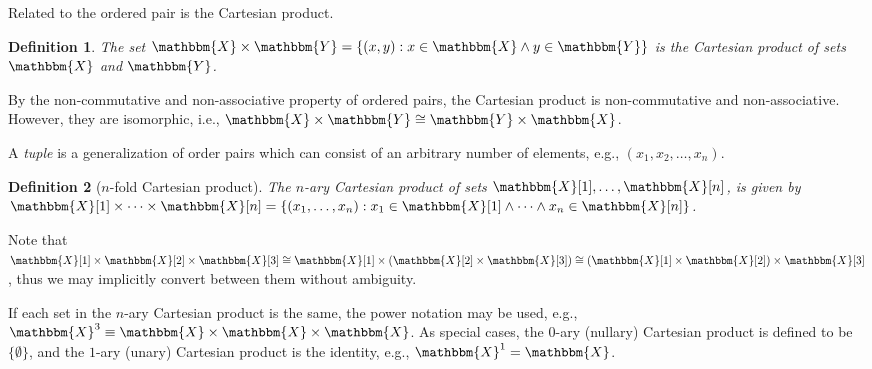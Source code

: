 \documentclass[hidelinks,11pt,final]{article}
\newcommand{\envnumstyle}{section}
\theoremstyle{plain}
\newtheorem{definition}{Definition}[\envnumstyle]
\newcounter{examplecounter}
\newenvironment{example}
{
    \refstepcounter{examplecounter}%
    \par\vspace{\baselineskip}\noindent 
    \textbf{Example \theexamplecounter}%
    \begin{itshape}
    \quad
}
{
    \end{itshape}
    \par\vspace{\baselineskip}%
    \noindent\ignorespacesafterend     
}
\begin{document}
Related to the ordered pair is the Cartesian product.
\begin{definition}
The set $\mathbbm{X} \times \mathbbm{Y} = \left\{(x,y) : x \in 
\mathbbm{X} \land y \in \mathbbm{Y}\right\}$ is the Cartesian product of sets $\mathbbm{X}$ 
and $\mathbbm{Y}$.
\end{definition}
By the non-commutative and non-associative property of ordered pairs, the Cartesian product is non-commutative and non-associative.
However, they are isomorphic, i.e., $\mathbbm{X} \times \mathbbm{Y} \cong \mathbbm{Y} \times \mathbbm{X}$.

A \emph{tuple} is a generalization of order pairs which can consist of an arbitrary number of elements, e.g., $(x_1,x_2,\ldots,x_n)$.
\begin{definition}[$n$-fold Cartesian product]
The $n$-ary Cartesian product of sets $\mathbbm{X}[1],\ldots,\mathbbm{X}[n]$, is given by $\mathbbm{X}[1] \times \cdots \times \mathbbm{X}[n] = \left\{(x_1,\ldots,x_n) : x_1 \in \mathbbm{X}[1] \land \cdots \land x_n \in \mathbbm{X}[n]\right\}$.
\end{definition}
Note that $\mathbbm{X}[1] \times \mathbbm{X}[2] \times \mathbbm{X}[3] \cong \mathbbm{X}[1] \times \left(\mathbbm{X}[2] \times \mathbbm{X}[3]\right) \cong \left(\mathbbm{X}[1] \times \mathbbm{X}[2]\right) \times \mathbbm{X}[3]$, thus we may implicitly convert between them without ambiguity.

If each set in the $n$-ary Cartesian product is the same, the power notation may be used, e.g., $\mathbbm{X}^3 \equiv \mathbbm{X} \times \mathbbm{X} \times \mathbbm{X}$.
As special cases, the $0$-ary (nullary) Cartesian product is defined to be $\{ \emptyset \}$, and the $1$-ary (unary) Cartesian product is the identity, e.g., $\mathbbm{X}^1 = \mathbbm{X}$.



\end{document}
